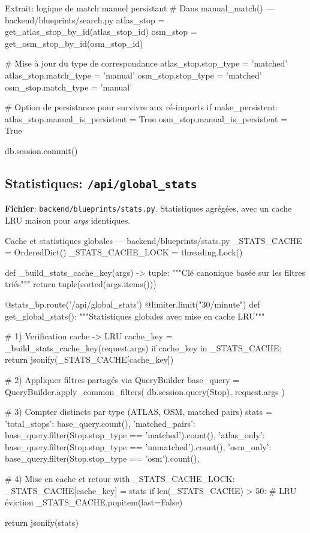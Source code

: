 \begin{codebox}[language=Python]{Extrait: logique de match manuel persistant}
# Dans manual_match() — backend/blueprints/search.py
atlas_stop = get_atlas_stop_by_id(atlas_stop_id)
osm_stop = get_osm_stop_by_id(osm_stop_id)

# Mise à jour du type de correspondance
atlas_stop.stop_type = 'matched'
atlas_stop.match_type = 'manual'
osm_stop.stop_type = 'matched'
osm_stop.match_type = 'manual'

# Option de persistance pour survivre aux ré-imports
if make_persistent:
    atlas_stop.manual_is_persistent = True
    osm_stop.manual_is_persistent = True

db.session.commit()
\end{codebox}

\subsection{Statistiques: \texttt{/api/global\_stats}}

\textbf{Fichier}: \texttt{backend/blueprints/stats.py}. Statistiques agrégées, avec un cache LRU maison pour \textit{args} identiques.

\begin{codebox}[language=Python]{Cache et statistiques globales — backend/blueprints/stats.py}
_STATS_CACHE = OrderedDict()
_STATS_CACHE_LOCK = threading.Lock()

def _build_stats_cache_key(args) -> tuple:
    """Clé canonique basée sur les filtres triés"""
    return tuple(sorted(args.items()))

@stats_bp.route('/api/global_stats')
@limiter.limit("30/minute")
def get_global_stats():
    """Statistiques globales avec mise en cache LRU"""
    
    # 1) Verification cache -> LRU
    cache_key = _build_stats_cache_key(request.args)
    if cache_key in _STATS_CACHE:
        return jsonify(_STATS_CACHE[cache_key])
    
    # 2) Appliquer filtres partagés via QueryBuilder
    base_query = QueryBuilder.apply_common_filters(
        db.session.query(Stop), request.args
    )
    
    # 3) Compter distincts par type (ATLAS, OSM, matched pairs)
    stats = {
        'total_stops': base_query.count(),
        'matched_pairs': base_query.filter(Stop.stop_type == 'matched').count(),
        'atlas_only': base_query.filter(Stop.stop_type == 'unmatched').count(),
        'osm_only': base_query.filter(Stop.stop_type == 'osm').count(),
    }
    
    # 4) Mise en cache et retour
    with _STATS_CACHE_LOCK:
        _STATS_CACHE[cache_key] = stats
        if len(_STATS_CACHE) > 50:  # LRU éviction
            _STATS_CACHE.popitem(last=False)
    
    return jsonify(stats)
\end{codebox}

